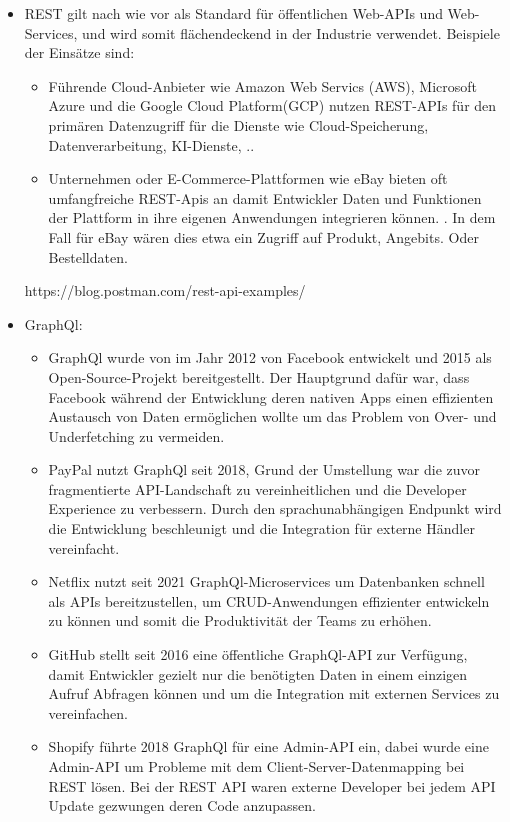 \begin{itemize}
	\item REST gilt nach wie vor als Standard für öffentlichen Web-APIs und Web-Services, und wird somit flächendeckend in der Industrie verwendet. Beispiele der Einsätze sind:
		\begin{itemize}
			\item Führende Cloud-Anbieter wie Amazon Web Servics (AWS), Microsoft Azure und die Google Cloud Platform(GCP)  nutzen REST-APIs  für den primären Datenzugriff für  die Dienste wie Cloud-Speicherung, Datenverarbeitung, KI-Dienste, ..
			\item Unternehmen oder E-Commerce-Plattformen wie eBay bieten oft umfangfreiche REST-Apis an damit Entwickler Daten und Funktionen der Plattform in ihre eigenen Anwendungen integrieren können. . In dem Fall für eBay wären dies etwa ein Zugriff auf Produkt, Angebits. Oder Bestelldaten.
		\end{itemize}
		
	https://blog.postman.com/rest-api-examples/
		
	\item GraphQl:
		\begin{itemize}
			 \item GraphQl wurde von im Jahr 2012 von Facebook entwickelt und 2015 als Open-Source-Projekt bereitgestellt. Der Hauptgrund dafür war, dass Facebook während der Entwicklung deren nativen Apps einen effizienten Austausch von Daten ermöglichen wollte um das Problem von Over- und Underfetching zu vermeiden.
			\item PayPal nutzt GraphQl seit 2018, Grund der Umstellung war die zuvor fragmentierte API-Landschaft zu vereinheitlichen und die Developer Experience zu verbessern. Durch den sprachunabhängigen Endpunkt wird die Entwicklung beschleunigt und die Integration für externe Händler vereinfacht. 
			\item Netflix nutzt seit 2021 GraphQl-Microservices um Datenbanken schnell als APIs bereitzustellen, um CRUD-Anwendungen effizienter entwickeln zu können und somit die Produktivität der Teams zu erhöhen.
			\item GitHub stellt seit 2016 eine öffentliche GraphQl-API zur Verfügung, damit Entwickler gezielt nur die benötigten Daten in einem einzigen Aufruf Abfragen können und um die Integration mit externen Services zu vereinfachen.
			\item Shopify führte 2018 GraphQl für eine Admin-API ein, dabei wurde eine Admin-API um Probleme mit dem Client-Server-Datenmapping bei REST lösen. Bei der REST API waren externe Developer bei jedem API Update gezwungen deren Code anzupassen.
			

\end{itemize}
\end{itemize}
